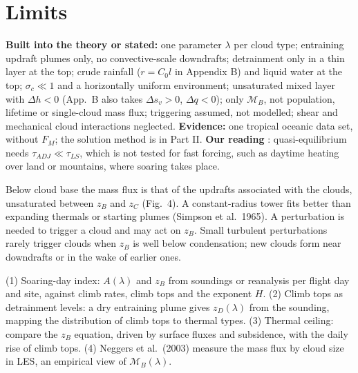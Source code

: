 \documentclass[10pt,a4paper]{article}
\newcommand{\MB}{\mathcal M_B}
\begin{document}
\section{Limits}
\textbf{Built into the theory or stated:} one parameter $\lambda$ per cloud type; entraining updraft plumes only, no convective-scale downdrafts; detrainment only in a thin layer at the top; crude rainfall ($r=C_0l$ in Appendix B) and liquid water at the top; $\sigma_c\ll1$ and a horizontally uniform environment; unsaturated mixed layer with $\Delta h<0$ (App.\ B also takes $\Delta s_v>0$, $\Delta q<0$); only $\MB$, not population, lifetime or single-cloud mass flux; triggering assumed, not modelled; shear and mechanical cloud interactions neglected. \textbf{Evidence:} one tropical oceanic data set, without $F_M$; the solution method is in Part II. \textbf{Our reading} \ours: quasi-equilibrium needs $\tau_{ADJ}\ll\tau_{LS}$, which is not tested for fast forcing, such as daytime heating over land or mountains, where soaring takes place.

\begin{tcbraster}[raster columns=2,raster equal height=rows,raster column skip=3mm,raster force size=false]
\begin{paperbox}
Below cloud base the mass flux is that of the updrafts associated with the clouds, unsaturated between $z_B$ and $z_C$ (Fig.\ 4). A constant-radius tower fits better than expanding thermals or starting plumes (Simpson et al.\ 1965). A perturbation is needed to trigger a cloud and may act on $z_B$. Small turbulent perturbations rarely trigger clouds when $z_B$ is well below condensation; new clouds form near downdrafts or in the wake of earlier ones.
\end{paperbox}
\begin{ideabox}
(1) Soaring-day index: $A(\lambda)$ and $z_B$ from soundings or reanalysis per flight day and site, against climb rates, climb tops and the exponent $H$. (2) Climb tops as detrainment levels: a dry entraining plume gives $z_D(\lambda)$ from the sounding, mapping the distribution of climb tops to thermal types. (3) Thermal ceiling: compare the $z_B$ equation, driven by surface fluxes and subsidence, with the daily rise of climb tops. (4) Neggers et al.\ (2003) measure the mass flux by cloud size in LES, an empirical view of $\MB(\lambda)$.
\end{ideabox}
\end{tcbraster}
\end{document}
